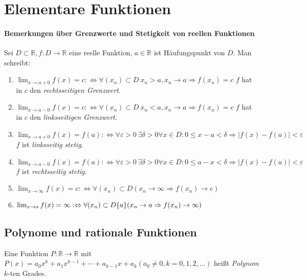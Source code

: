 \documentclass[ngerman,titlepage,twoside, parskip=half*]{scrreprt}
\newcommand*{\R}{\mathbb{R}}
\newcommand*{\perdef}{:\Leftrightarrow}
\theoremstyle{plain}
\theoremstyle{definition}
\theoremstyle{remark}
\newcommand*{\abs}[2][]{#1\lvert#2#1\rvert}
\begin{document}
\section{Elementare Funktionen}
\paragraph{Bemerkungen über Grenzwerte und Stetigkeit von reellen Funktionen}

Sei $D\subset \R , f\colon D\rightarrow \R$ eine reelle Funktion, $a\in\R$ ist Häufungspunkt von $D$. Man schreibt:
\begin{enumerate}[(1)]
  \item $\lim_{x\rightarrow a+0}f(x)=c\perdef \forall (x_n)\subset D\ x_n>a,x_n\rightarrow a\Rightarrow f(x_n)=c$ $f$ hat in $c$
    den \emph{rechtsseitigen Grenzwert}.
  \item $\lim_{x\rightarrow a-0}f(x)=c\perdef \forall (x_n)\subset D\ x_n<a,x_n\rightarrow a\Rightarrow f(x_n)=c$ $f$ hat in $c$
    den \emph{linksseitigen Grenzwert}.
  \item $\lim_{x\rightarrow a+0}f(x)=f(a)\perdef \forall \varepsilon >0\ \exists \delta >0 \forall x \in D\colon 0\leq x-a<\delta
    \Rightarrow \abs{f(x)-f(a)}<\varepsilon$ $f$ ist \emph{linksseitig stetig}.
  \item $\lim_{x\rightarrow a-0}f(x)=f(a)\perdef \forall \varepsilon >0\ \exists \delta >0 \forall x \in D\colon 0\leq a-x<\delta
    \Rightarrow \abs{f(x)-f(a)}<\varepsilon$ $f$ ist \emph{rechtsseitig stetig}.
  \item $\lim_{x\rightarrow\infty} f(x)=c\perdef \forall (x_n)\subset D (x_n \rightarrow \infty \Rightarrow f(x_n)\rightarrow c)$
  \item $\lim_{x\rightarrow a} f(x)=\infty\perdef \forall (x_n)\subset D\\\{a\} (x_n \rightarrow a \Rightarrow f(x_n)\rightarrow \infty)$
\end{enumerate}

\subsection{Polynome und rationale Funktionen}

Eine Funktion $P\colon\R\rightarrow \R$ mit $P(x)=a_0x^k+a_1x^{k-1}+\cdots + a_{k-1}x+a_k (a_0\neq 0, k=0,1,2,\ldots)$ heißt
\emph{Polynom} $k$-ten Grades.
\end{document}
